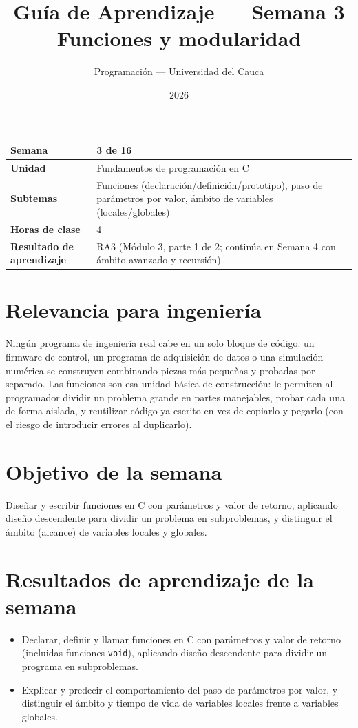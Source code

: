 \documentclass[11pt,letterpaper]{article}
\title{\textcolor{unicaucaverde}{\Large Guía de Aprendizaje --- Semana 3}\\[4pt]
  \large Funciones y modularidad}
\author{Programación --- Universidad del Cauca}
\date{2026}
\begin{document}
\maketitle

\begin{center}
\begin{tabular}{|>{\bfseries}p{4cm}|p{10cm}|}
\hline
Semana & 3 de 16 \\ \hline
Unidad & Fundamentos de programación en C \\ \hline
Subtemas & Funciones (declaración/definición/prototipo), paso de parámetros por valor, ámbito de
  variables (locales/globales) \\ \hline
Horas de clase & 4 \\ \hline
Resultado de aprendizaje & RA3 (Módulo 3, parte 1 de 2; continúa en Semana 4 con ámbito avanzado
  y recursión) \\ \hline
\end{tabular}
\end{center}

\section*{Relevancia para ingeniería}

Ningún programa de ingeniería real cabe en un solo bloque de código: un firmware de control, un
programa de adquisición de datos o una simulación numérica se construyen combinando piezas más
pequeñas y probadas por separado. Las funciones son esa unidad básica de construcción: le permiten
al programador dividir un problema grande en partes manejables, probar cada una de forma aislada,
y reutilizar código ya escrito en vez de copiarlo y pegarlo (con el riesgo de introducir errores
al duplicarlo).

\section{Objetivo de la semana}

Diseñar y escribir funciones en C con parámetros y valor de retorno, aplicando diseño descendente
para dividir un problema en subproblemas, y distinguir el ámbito (alcance) de variables locales y
globales.

\section{Resultados de aprendizaje de la semana}

\begin{itemize}[leftmargin=1.2cm]
  \item[\textbf{RA3.1.}] Declarar, definir y llamar funciones en C con parámetros y valor de
        retorno (incluidas funciones \texttt{void}), aplicando diseño descendente para dividir un
        programa en subproblemas.
  \item[\textbf{RA3.2.}] Explicar y predecir el comportamiento del paso de parámetros por valor, y
        distinguir el ámbito y tiempo de vida de variables locales frente a variables globales.
\end{itemize}
\end{document}
